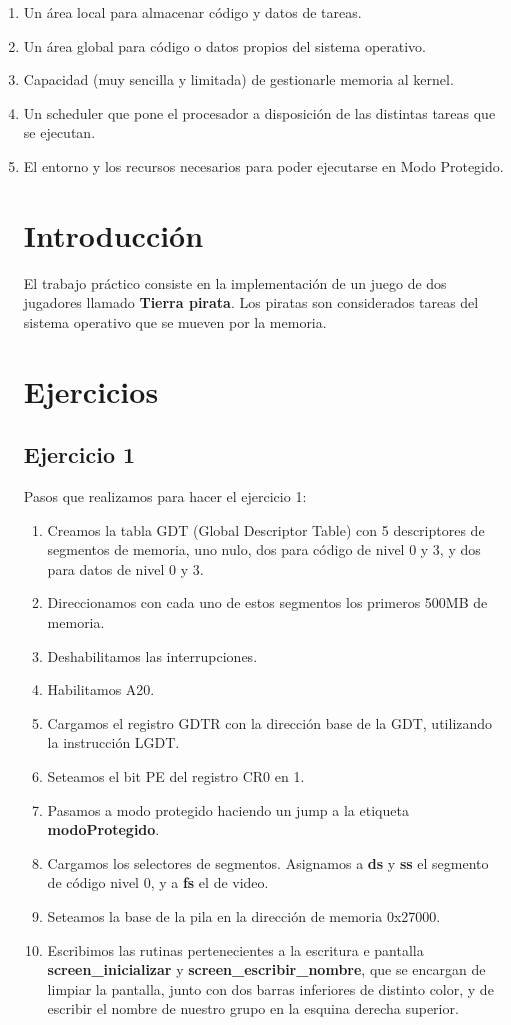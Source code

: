 \documentclass[a4paper,10pt]{article}
\begin{document}
\begin{enumerate}
  \item Un área local para almacenar código y datos de tareas.
  \item Un área global para código o datos propios del sistema operativo.
  \item Capacidad (muy sencilla y limitada) de gestionarle memoria al kernel.
  \item Un scheduler que pone el procesador a disposición de las distintas tareas que se ejecutan.
  \item El entorno y los recursos necesarios para poder ejecutarse en Modo Protegido.

\section{Introducción}
El trabajo práctico consiste en la implementación de un juego de dos jugadores llamado \textbf{Tierra pirata}.
Los piratas son considerados tareas del sistema operativo que se mueven por la memoria.

\section{Ejercicios}

\subsection{Ejercicio 1}
Pasos que realizamos para hacer el ejercicio 1:
\begin{enumerate}
  \item Creamos la tabla GDT (Global Descriptor Table) con 5 descriptores de segmentos de memoria, uno nulo, dos para código de nivel 0 y 3, y dos para datos de nivel 0 y 3.
  \item Direccionamos con cada uno de estos segmentos los primeros 500MB de memoria.
  \item Deshabilitamos las interrupciones.
  \item Habilitamos A20.
  \item Cargamos el registro GDTR con la dirección base de la GDT, utilizando la instrucción LGDT.
  \item Seteamos el bit PE del registro CR0 en 1.
  \item Pasamos a modo protegido haciendo un jump a la etiqueta \textbf{modoProtegido}.
  \item Cargamos los selectores de segmentos. Asignamos a \textbf{ds} y \textbf{ss} el segmento de código nivel 0, y a \textbf{fs} el de video.
  \item Seteamos la base de la pila en la dirección de memoria 0x27000.
  \item Escribimos las rutinas pertenecientes a la escritura e pantalla \textbf{screen\_inicializar} y \textbf{screen\_escribir\_nombre}, que se encargan de limpiar la pantalla,
    junto con dos barras inferiores de distinto color, y de escribir el nombre de nuestro grupo en la esquina derecha superior. 
\end{enumerate}


\end{enumerate}
\end{document}
